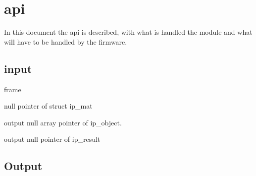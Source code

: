 \section*{api}

In this document the api is described, with what is handled the module and what will have to be handled by the firmware.

\subsection*{input}


\begin{DoxyItemize}
\item frame
\begin{DoxyItemize}
\item null pointer of struct ip\+\_\+mat 
\begin{DoxyCode}{0}
\DoxyCodeLine{  \{}
\end{DoxyCode}

\end{DoxyItemize}
\item output null array pointer of ip\+\_\+object.
\item output null pointer of ip\+\_\+result
\end{DoxyItemize}

\subsection*{Output}